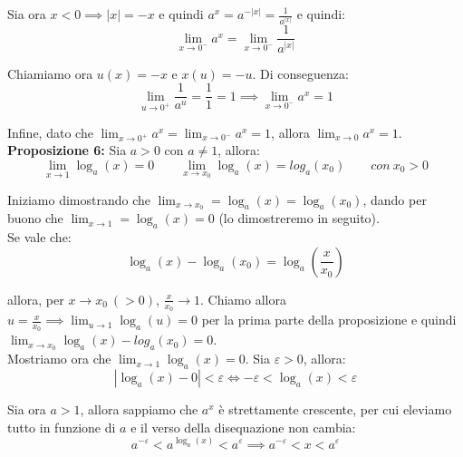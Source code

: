 \documentclass{article}
\begin{document}
\noindent Sia ora $x < 0 \implies |x| = -x$ e quindi $a^x = a^{-|x|} = \frac{1}{a^{|x|}}$ e quindi:
\begin{equation*}
    \lim_{x \to 0^-} a^x = \lim_{x \to 0^-} \frac{1}{a^{|x|}}
\end{equation*}

\noindent Chiamiamo ora $u(x) = -x$ e $x(u) = -u$. Di conseguenza:
\begin{equation*}
    \lim_{u \to 0^+} \frac{1}{a^u} = \frac{1}{1} = 1 \implies \lim_{x \to 0^-} a^x = 1
\end{equation*}

\noindent Infine, dato che $\lim_{x \to 0^+} a^x = \lim_{x \to 0^-} a^x = 1$, allora $\lim_{x \to 0} a^x = 1$.\\

\noindent\textbf{Proposizione 6:} Sia $a > 0$ con $a \neq 1$, allora:
\begin{equation*}
    \lim_{x \to 1} \log_a(x) = 0 \qquad \lim_{x \to x_0} \log_a(x) = log_a(x_0) \qquad con \ x_0 > 0
\end{equation*}

\noindent Iniziamo dimostrando che $\lim_{x \to x_0} = \log_a(x) = \log_a(x_0)$, dando per buono che $\lim_{x \to 1} = \log_a(x) = 0$ (lo dimostreremo in seguito).\\
Se vale che:
\begin{equation*}
    \log_a(x) - \log_a(x_0) = \log_a\left(\frac{x}{x_0}\right)
\end{equation*}

\noindent allora, per $x \to x_0 \ (> 0)$, $\frac{x}{x_0} \to 1$. Chiamo allora $u = \frac{x}{x_0} \implies \lim_{u \to 1} \log_a(u) = 0$ per la prima parte della proposizione e quindi $\lim_{x \to x_0} \log_a(x) - log_a(x_0) = 0$.\\

\noindent Mostriamo ora che $\lim_{x \to 1} \log_a(x) = 0$. Sia $\varepsilon > 0$, allora:
\begin{equation*}
    |\log_a(x) - 0| < \varepsilon \iff -\varepsilon < \log_a(x) < \varepsilon
\end{equation*}

\noindent Sia ora $a > 1$, allora sappiamo che $a^x$ è strettamente crescente, per cui eleviamo tutto in funzione di $a$ e il verso della disequazione non cambia:
\begin{equation*}
    a^{-\varepsilon} < a^{\log_a(x)} < a^\varepsilon \implies a^{-\varepsilon} < x < a^\varepsilon
\end{equation*}
\end{document}
